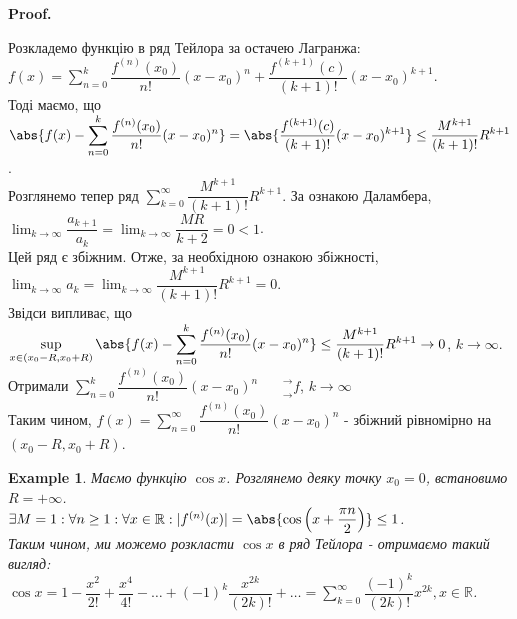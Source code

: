 \documentclass[a4paper, 10pt]{article}
\makeatletter
\def\huge{\displaystyle}
\def\qed{$\blacksquare$}
\theoremstyle{theoremdd}
\theoremstyle{theoremdd}
\theoremstyle{theoremdd}
\theoremstyle{theoremdd}
\theoremstyle{theoremdd}
\newtheorem{example}[theorem]{Example}
\theoremstyle{theoremdd}
\theoremstyle{theoremdd}
\theoremstyle{theoremdd}
\theoremstyle{theoremdd}
\newtheorem{corollary}[theorem]{Corollary}
\renewenvironment{proof}[1][Proof.\\]{\par
\pushQED{\hfill \qed}%
\normalfont \topsep6\p@\@plus6\p@\relax
\trivlist
\item\relax
{\bfseries
#1\@addpunct{.}}\hspace\labelsep\ignorespaces
}{%
\popQED\endtrivlist\@endpefalse
}
\makeatother
\begin{document}
\begin{proof}
Розкладемо функцію в ряд Тейлора за остачею Лагранжа:\\
$f(x) = \huge \sum_{n=0}^k \dfrac{f^{(n)}(x_0)}{n!}(x-x_0)^n + \dfrac{f^{(k+1)}(c)}{(k+1)!}(x-x_0)^{k+1}$.\\
Тоді маємо, що\\
$\huge \abs{f(x) - \sum_{n=0}^k \dfrac{f^{(n)}(x_0)}{n!}(x-x_0)^n} = \abs{\dfrac{f^{(k+1)}(c)}{(k+1)!}(x-x_0)^{k+1}} \leq \dfrac{M^{k+1}}{(k+1)!}R^{k+1}$.\\
Розглянемо тепер ряд $\huge \sum_{k=0}^\infty \dfrac{M^{k+1}}{(k+1)!} R^{k+1}$. За ознакою Даламбера, $\huge \lim_{k \to \infty} \dfrac{a_{k+1}}{a_k} = \huge \lim_{k \to \infty} \dfrac{MR}{k+2} = 0 < 1$.\\
Цей ряд є збіжним. Отже, за необхідною ознакою збіжності, $\huge \lim_{k \to \infty} a_k = \lim_{k \to \infty} \dfrac{M^{k+1}}{(k+1)!} R^{k+1} = 0$.\\
Звідси випливає, що\\
$\huge \sup_{x \in (x_0-R,x_0+R)} \abs{f(x) - \sum_{n=0}^k \dfrac{f^{(n)}(x_0)}{n!}(x-x_0)^n} \leq \dfrac{M^{k+1}}{(k+1)!}R^{k+1} \to 0$, $k \to \infty$.\\
Отримали $\huge \sum_{n=0}^k \dfrac{f^{(n)}(x_0)}{n!}(x-x_0)^n \phantom{()}^\rightarrow_\rightarrow f$, $k \to \infty$\\
Таким чином, $f(x) = \huge \sum_{n=0}^\infty \dfrac{f^{(n)}(x_0)}{n!}(x-x_0)^n$ - збіжний рівномірно на $(x_0-R,x_0+R)$.
\end{proof}

\begin{example}
Маємо функцію $\cos x$. Розглянемо деяку точку $x_0 = 0$, встановимо $R = +\infty$.\\
$\exists M = 1: \forall n \geq 1: \forall x \in \mathbb{R}: |f^{(n)}(x)| = \abs{\cos \left( x + \dfrac{\pi n}{2} \right)} \leq 1$.\\
Таким чином, ми можемо розкласти $\cos x$ в ряд Тейлора - отримаємо такий вигляд:\\
$\cos x = 1 - \dfrac{x^2}{2!} + \dfrac{x^4}{4!} - \dots + (-1)^k \dfrac{x^{2k}}{(2k)!} + \dots = \huge\sum_{k=0}^\infty \dfrac{(-1)^k}{(2k)!} x^{2k}, x \in \mathbb{R}$.
\end{example}
\end{document}
